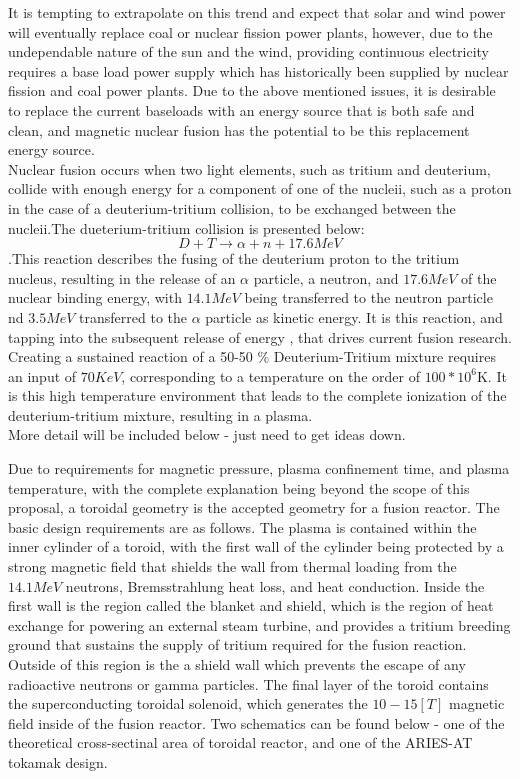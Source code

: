 \documentclass{article}
\begin{document}
It is tempting to extrapolate on this trend and expect that solar and wind power will eventually replace coal or nuclear fission power plants, however, due to the undependable nature of the sun and the wind, providing continuous electricity requires a base load power supply which has historically been supplied by nuclear fission and coal power plants. Due to the above mentioned issues, it is desirable to replace the current baseloads with an energy source that is both safe and clean, and  magnetic nuclear fusion has the potential to be this replacement energy source.\\
Nuclear fusion occurs when two light elements, such as tritium and deuterium, collide with enough energy for a component of one of the nucleii, such as a proton in the case of a deuterium-tritium collision, to be exchanged  between the nucleii.The dueterium-tritium collision is presented below:
$$
D+T \rightarrow \alpha + n + 17.6 MeV
$$  
\cite{J_Friedberg:1} .This reaction describes the fusing of the deuterium proton to the tritium nucleus, resulting in the release of an $\alpha$ particle, a neutron, and $17.6 MeV$ of the nuclear binding energy, with $14.1 MeV$ being transferred to the neutron particle nd $3.5 MeV$ transferred to the $\alpha$ particle as kinetic energy. It is this reaction, and tapping into the subsequent release of energy , that drives current fusion research. Creating a sustained reaction of a 50-50 $\%$ Deuterium-Tritium mixture requires an input of $70KeV$, corresponding to a temperature on the order of $100*10^6$K. It is this high temperature environment that leads to the complete ionization of the deuterium-tritium mixture, resulting in a plasma.  \\

More detail will be included below - just need to get ideas down. 

Due to requirements for magnetic pressure, plasma confinement time, and plasma temperature, with the complete explanation being beyond the scope of this proposal, a toroidal geometry is the accepted geometry for a fusion reactor. The basic design requirements are as follows. The plasma is contained within the inner cylinder of a toroid, with the first wall of the cylinder being protected by a strong magnetic field that shields the wall from thermal loading from the $14.1 MeV$ neutrons,  Bremsstrahlung heat loss, and heat conduction. Inside the first wall is the region called the blanket and shield, which is the region of heat exchange for powering an external steam turbine, and provides a tritium breeding ground that sustains the supply of tritium required for the fusion reaction. Outside of this region is the a shield wall which prevents the escape of any radioactive neutrons or gamma particles. The final layer of the toroid contains the superconducting toroidal solenoid, which generates the $10-15 [T]$ magnetic field inside of the fusion reactor. Two schematics can be found below - one of the theoretical cross-sectinal area of toroidal reactor, and one of the ARIES-AT tokamak  design.
\end{document}
